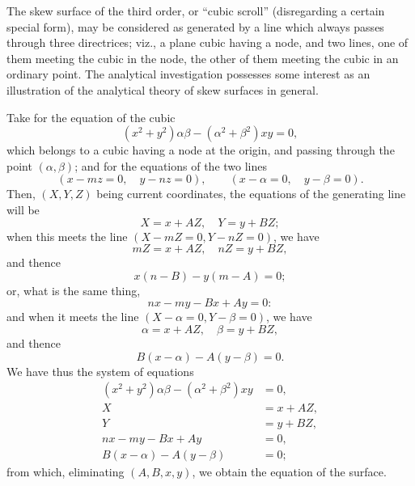 \documentclass[11pt,a4paper]{article}
\theoremstyle{plain}
\begin{document}
\medskip

The skew surface of the third order, or ``cubic scroll'' (disregarding a certain special form), may be considered as generated by a line which always passes through three directrices; viz., a plane cubic having a node, and two lines, one of them meeting the cubic in the node, the other of them meeting the cubic in an ordinary point. The analytical investigation possesses some interest as an illustration of the analytical theory of skew surfaces in general.

Take for the equation of the cubic
\[
(x^2 + y^2)\alpha\beta - (\alpha^2 + \beta^2)xy = 0,
\]
which belongs to a cubic having a node at the origin, and passing through the point $(\alpha, \beta)$; and for the equations of the two lines
\[
(x - mz = 0, \quad y - nz = 0), \qquad (x - \alpha = 0, \quad y - \beta = 0).
\]
Then, $(X, Y, Z)$ being current coordinates, the equations of the generating line will be
\[
X = x + AZ, \quad Y = y + BZ;
\]
when this meets the line $(X - mZ = 0, Y - nZ = 0)$, we have
\[
mZ = x + AZ, \quad nZ = y + BZ,
\]
and thence
\[
x(n - B) - y(m - A) = 0;
\]
or, what is the same thing,
\[
nx - my - Bx + Ay = 0:
\]
and when it meets the line $(X - \alpha = 0, Y - \beta = 0)$, we have
\[
\alpha = x + AZ, \quad \beta = y + BZ,
\]
and thence
\[
B(x - \alpha) - A(y - \beta) = 0.
\]
We have thus the system of equations
\begin{align*}
(x^2 + y^2)\alpha\beta - (\alpha^2 + \beta^2)xy &= 0, \\
X &= x + AZ, \\
Y &= y + BZ, \\
nx - my - Bx + Ay &= 0, \\
B(x - \alpha) - A(y - \beta) &= 0;
\end{align*}
from which, eliminating $(A, B, x, y)$, we obtain the equation of the surface.
\end{document}
